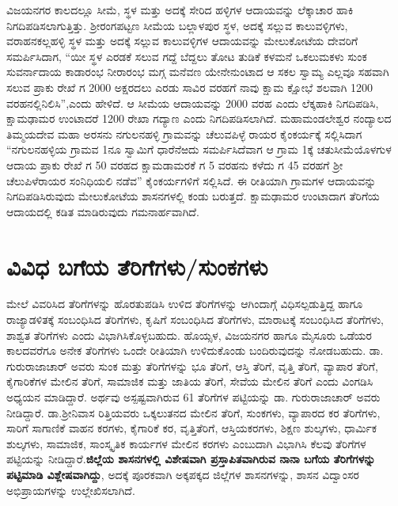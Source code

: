 ವಿಜಯನಗರ ಕಾಲದಲ್ಲೂ ಸೀಮೆ, ಸ್ಥಳ ಮತ್ತು ಅದಕ್ಕೆ ಸೇರಿದ ಹಳ್ಳಿಗಳ ಆದಾಯವನ್ನು ಲೆಕ್ಕಾಚಾರ ಹಾಕಿ ನಿಗದಿಪಡಿಸಲಾಗುತ್ತಿತ್ತು. ಶ‍್ರೀರಂಗಪಟ್ಟಣ ಸೀಮೆಯ ಬಲ್ಲಾಳಪುರ ಸ್ಥಳ, ಅದಕ್ಕೆ ಸಲ್ಲುವ ಕಾಲುವಳ್ಳಿಗಳು, ವರಾಹನಕಲ್ಲಹಳ್ಳಿ ಸ್ಥಳ ಮತ್ತು ಅದಕ್ಕೆ ಸಲ್ಲುವ ಕಾಲುವಳ್ಳಿಗಳ ಆದಾಯವನ್ನು ಮೇಲುಕೋಟೆಯ ದೇವರಿಗೆ ಸಮರ್ಪಿಸಿದಾಗ, “ಯೀ ಸ್ಥಳ ಎರಡಕೆ ಸಲುವ ಗದ್ದೆ ಬೆದ್ದಲು ತೋಟ ತುಡಿಕೆ ಕಳಮನೆ ಒಕಲುಮಕಳು ಸುಂಕ ಸುವರ್ನಾದಾಯ ಕಾಡಾರಂಭ ನೀರಾರಂಭ ಮಗ್ಗ ಮನೆವಣ ಯೇನೇನುಂಟಾದ ಆ ಸಕಲ ಸ್ವಾಮ್ಯ ಎಲ್ಲವೂ ಸಹವಾಗಿ ಸಲುವ ಪ್ರಾಕು ರೇಖೆ ಗ 2000 ಅಕ್ಷರದಲು ಎರಡು ಸಾವಿರ ವರಹಗೆ ನಾವು ಕ್ಷಾಮ ಕ್ಷೋಭೆ ಶಲವಾಗಿ 1200 ವರಹನಲ್ಲಿನಿಲಿಸಿ”,ಎಂದು ಹೇಳಿದೆ. ಆ ಸೀಮೆಯ ಆದಾಯವನ್ನು 2000 ವರಹ ಎಂದು ಲೆಕ್ಕಹಾಕಿ ನಿಗದಿಪಡಿಸಿ, ಕ್ಷಾಮಢಾಮರ ಉಂಟಾದರೆ 1200 ರೇಖಾ ಗದ್ಯಾಣ ಎಂದು ನಿಗದಿಪಡಿಸಲಾಗಿದೆ. ಮಹಾಮಂಡಲೇಶ್ವರ ನಂದ್ಯಾಲದ ತಿಮ್ಮಯದೇವ ಮಹಾ ಅರಸನು ನಗುಲನಹಳ್ಳಿ ಗ್ರಾಮವನ್ನು ಚೆಲುವಪಿಳ್ಳೆ ರಾಯರ ಕೈಂಕರ್ಯಕ್ಕೆ ಸಲ್ಲಿಸಿದಾಗ “ನಗುಲನಹಳ್ಳಿಯ ಗ್ರಾಮವ 1ನೂ ಸ್ವಾಮಿಗೆ ಧಾರೆನೆಱದು ಸಮರ್ಪಿಸಿದೆವಾಗ ಆ ಗ್ರಾಮ 1ಕ್ಕೆ ಚತುಸೀಮೆಯೊಳಗುಳ ಆದಾಯ ಪ್ರಾಕು ರೇಖೆ ಗ 50 ವರಹದ ಕ್ಷಾಮಡಾಮರಕೆ ಗ 5 ವರಹನು ಕಳೆದು ಗ 45 ವರಹಗೆ ಶ‍್ರೀ ಚೆಲುಪಿಳೆರಾಯರ ಸಂನಿಧಿಯಲಿ ನಡೆವ” ಕೈಂಕರ್ಯಗಳಿಗೆ ಸಲ್ಲಿಸಿದೆ. ಈ ರೀತಿಯಾಗಿ ಗ್ರಾಮಗಳ ಆದಾಯವನ್ನು ನಿಗದಿಪಡಿಸಿರುವುದು ಮೇಲುಕೋಟೆಯ ಶಾಸನಗಳಲ್ಲಿ ಕಂಡು ಬರುತ್ತದೆ. ಕ್ಷಾಮಢಾಮರ ಉಂಟಾದಾಗ ತೆರಿಗೆಯ ಆದಾಯದಲ್ಲಿ ಕಡಿತ ಮಾಡಿರುವುದು ಗಮನಾರ್ಹವಾಗಿದೆ.

\newpage

\section{ವಿವಿಧ ಬಗೆಯ ತೆರಿಗೆಗಳು/ಸುಂಕಗಳು}

ಮೇಲೆ ವಿವರಿಸಿದ ತೆರಿಗೆಗಳನ್ನು ಹೊರತುಪಡಿಸಿ ಉಳಿದ ತೆರಿಗೆಗಳನ್ನು ಆಗಿಂದಾಗ್ಗೆ ವಿಧಿಸಲ್ಪಡುತ್ತಿದ್ದ ಹಾಗೂ ರಾಜ್ಯಾಡಳಿತಕ್ಕೆ ಸಂಬಂಧಿಸಿದ ತೆರಿಗೆಗಳು, ಕೃಷಿಗೆ ಸಂಬಂಧಿಸಿದ ತೆರಿಗೆಗಳು, ಮಾರಾಟಕ್ಕೆ ಸಂಬಂಧಿಸಿದ ತೆರಿಗೆಗಳು, ಶಾಶ್ವತ ತೆರಿಗೆಗಳು ಎಂದು ವಿಭಾಗಿಸಿಕೊಳ್ಳಬಹುದು. ಹೊಯ್ಸಳ, ವಿಜಯನಗರ ಹಾಗೂ ಮೈಸೂರು ಒಡೆಯರ ಕಾಲದವರೆಗೂ ಅನೇಕ ತೆರಿಗೆಗಳು ಒಂದೇ ರೀತಿಯಾಗಿ ಉಳಿದುಕೊಂಡು ಬಂದಿರುವುದನ್ನು ನೋಡಬಹುದು. ಡಾ. ಗುರುರಾಜಾಚಾರ್​ ಅವರು ಸುಂಕ ಮತ್ತು ತೆರಿಗೆಗಳನ್ನು ಭೂ ತೆರಿಗೆ, ಆಸ್ತಿ ತೆರಿಗೆ, ವೃತ್ತಿ ತೆರಿಗೆ, ವ್ಯಾಪಾರ ತೆರಿಗೆ, ಕೈಗಾರಿಕೆಗಳ ಮೇಲಿನ ತೆರಿಗೆ, ಸಾಮಾಜಿಕ ಮತ್ತು ಜಾತಿಯ ತೆರಿಗೆ, ಸೇವೆಯ ಮೇಲಿನ ತೆರಿಗೆ ಎಂದು ವಿಂಗಡಿಸಿ ಅಧ್ಯಯನ ಮಾಡಿದ್ದಾರೆ. ಅರ್ಥವು ಅಸ್ಪಷ್ಟವಾಗಿರುವ 61 ತೆರಿಗೆಗಳ ಪಟ್ಟಿಯನ್ನು ಡಾ. ಗುರುರಾಜಾಚಾರ್ ಅವರು ನೀಡಿದ್ದಾರೆ. ಡಾ.ಶ‍್ರೀನಿವಾಸ ರಿತ್ತಿಯವರು ಒಕ್ಕಲುತನದ ಮೇಲಿನ ತೆರಿಗೆ, ಸುಂಕಗಳು, ವ್ಯಾಪಾರದ ಕರ ತೆರಿಗೆಗಳು, ಸಾರಿಗೆ ಸಾಗಾಣಿಕೆ ವಾಹನ ಕರಗಳು, ಕೈಗಾರಿಕೆ ಕರ, ವೃತ್ತಿತೆರಿಗೆ, ಆಸ್ತಿಯಕರಗಳು, ಶಿಕ್ಷಣ ಶುಲ್ಕಗಳು, ಧಾರ್ಮಿಕ ಶುಲ್ಕಗಳು, ಸಾಮಾಜಿಕ, ಸಾಂಸ್ಕೃತಿಕ ಕಾರ್ಯಗಳ ಮೇಲಿನ ಕರಗಳು ಎಂಬುದಾಗಿ ವಿಭಾಗಿಸಿ ಕೆಲವು ತೆರಿಗೆಗಳ ಪಟ್ಟಿಯನ್ನು ನೀಡಿದ್ದಾರೆ.\textbf{ಜಿಲ್ಲೆಯ ಶಾಸನಗಳಲ್ಲಿ ವಿಶೇಷವಾಗಿ ಪ್ರಸ್ತಾಪಿತವಾಗಿರುವ ನಾನಾ ಬಗೆಯ ತೆರಿಗೆಗಳನ್ನು ಪಟ್ಟಿಮಾಡಿ ವಿಶ್ಲೇಷವಾಗಿದ್ದು}, ಅದಕ್ಕೆ ಪೂರಕವಾಗಿ ಅಕ್ಕಪಕ್ಕದ ಜಿಲ್ಲೆಗಳ ಶಾಸನಗಳನ್ನು, ಶಾಸನ ವಿದ್ವಾಂಸರ ಅಭಿಪ್ರಾಯಗಳನ್ನು ಉಲ್ಲೇಖಿಸಲಾಗಿದೆ.

